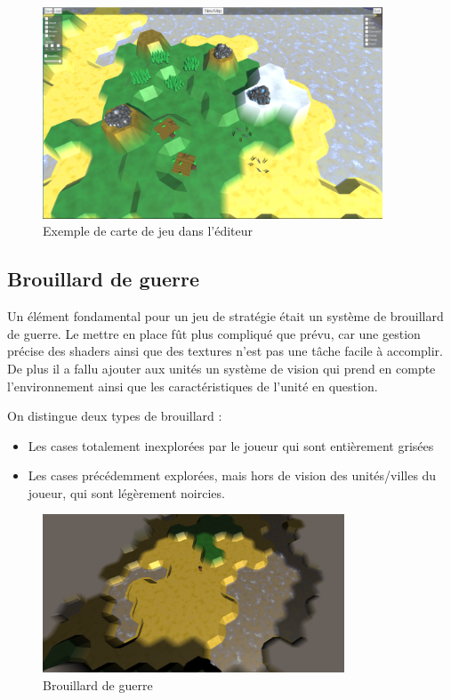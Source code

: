 \documentclass[12pt]{report}
\begin{document}
\begin{figure}
    \centering
    \includegraphics[width=0.9\textwidth]{map_example}
    \caption*{Exemple de carte de jeu dans l'éditeur}
\end{figure}

\subsection{Brouillard de guerre}

Un élément fondamental pour un jeu de stratégie était un système de brouillard
de guerre. Le mettre en place fût plus compliqué que prévu, car une gestion
précise des shaders ainsi que des textures n’est pas une tâche facile à
accomplir. De plus il a fallu ajouter aux unités un système de vision qui prend
en compte l’environnement ainsi que les caractéristiques de l’unité en question.

On distingue deux types de brouillard :

\begin{itemize}
    \item Les cases totalement inexplorées par le joueur qui sont entièrement
        grisées
    \item Les cases précédemment explorées, mais hors de vision des
        unités/villes du joueur, qui sont légèrement noircies.
\end{itemize}

\begin{figure}
    \centering
    \includegraphics[width=0.8\textwidth]{../report_2/img/FogOfWar}
    \caption*{Brouillard de guerre}
\end{figure}
\end{document}
